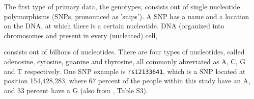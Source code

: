 The first type of primary data, the genotypes, 
consists out of single nucleotide polymorphisms (SNPs, pronounced as 'snips').
A SNP has a name and a location on the DNA, at which there is a certain nucleotide.
DNA (organized into chromosomes and present in every (nucleated) cell, 

consists out of billions of nucleotides.
There are four types of nucleotides, 
called adenosine, cytosine, guanine and thyrosine, all commonly abreviated
as A, C, G and T respectively.
One SNP example is \verb|rs12133641|, which is a SNP located at position 
154,428,283, where 67 percent of the people within this study have an A,
and 33 percent have a G (also from \cite{ahsan2017relative}, Table S3).

